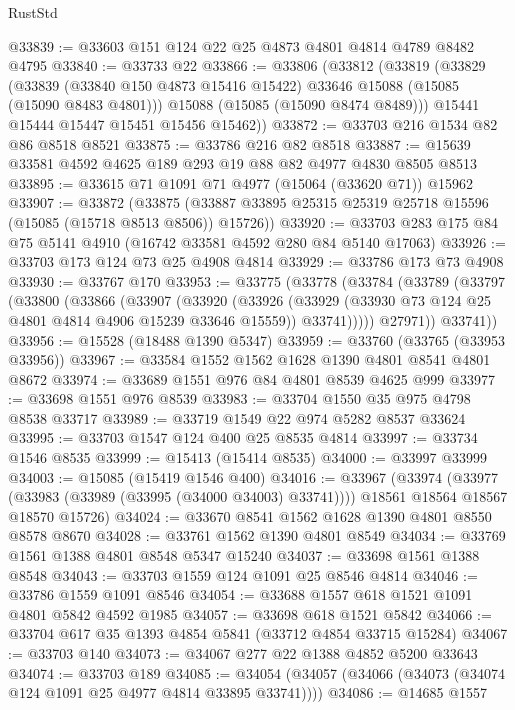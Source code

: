 \begin{lexlean}{RustStd}
\begin{coremodule}
@33839 := @33603 @151 @124 @22 @25 @4873 @4801 @4814 @4789 @8482 @4795
@33840 := @33733 @22
@33866 := @33806
    (@33812
      (@33819
        (@33829
          (@33839 (@33840 @150 @4873 @15416 @15422) @33646 @15088 (@15085 (@15090 @8483 @4801)))
          @15088
          (@15085 (@15090 @8474 @8489)))
        @15441
        @15444
        @15447
        @15451
        @15456
        @15462))
@33872 := @33703 @216 @1534 @82 @86 @8518 @8521
@33875 := @33786 @216 @82 @8518
@33887 := @15639 @33581 @4592 @4625 @189 @293 @19 @88 @82 @4977 @4830 @8505 @8513
@33895 := @33615 @71 @1091 @71 @4977 (@15064 (@33620 @71)) @15962
@33907 := @33872
    (@33875 (@33887 @33895 @25315 @25319 @25718 @15596 (@15085 (@15718 @8513 @8506)) @15726))
@33920 := @33703 @283 @175 @84 @75 @5141 @4910 (@16742 @33581 @4592 @280 @84 @5140 @17063)
@33926 := @33703 @173 @124 @73 @25 @4908 @4814
@33929 := @33786 @173 @73 @4908
@33930 := @33767 @170
@33953 := @33775
    (@33778
      (@33784
        (@33789
          (@33797
            (@33800
              (@33866
                (@33907
                  (@33920
                    (@33926
                      (@33929 (@33930 @73 @124 @25 @4801 @4814 @4906 @15239 @33646 @15559))
                      @33741)))))
            @27971))
        @33741))
@33956 := @15528 (@18488 @1390 @5347)
@33959 := @33760 (@33765 (@33953 @33956))
@33967 := @33584 @1552 @1562 @1628 @1390 @4801 @8541 @4801 @8672
@33974 := @33689 @1551 @976 @84 @4801 @8539 @4625 @999
@33977 := @33698 @1551 @976 @8539
@33983 := @33704 @1550 @35 @975 @4798 @8538 @33717
@33989 := @33719 @1549 @22 @974 @5282 @8537 @33624
@33995 := @33703 @1547 @124 @400 @25 @8535 @4814
@33997 := @33734 @1546 @8535
@33999 := @15413 (@15414 @8535)
@34000 := @33997 @33999
@34003 := @15085 (@15419 @1546 @400)
@34016 := @33967
    (@33974
      (@33977 (@33983 (@33989 (@33995 (@34000 @34003) @33741))))
      @18561
      @18564
      @18567
      @18570
      @15726)
@34024 := @33670 @8541 @1562 @1628 @1390 @4801 @8550 @8578 @8670
@34028 := @33761 @1562 @1390 @4801 @8549
@34034 := @33769 @1561 @1388 @4801 @8548 @5347 @15240
@34037 := @33698 @1561 @1388 @8548
@34043 := @33703 @1559 @124 @1091 @25 @8546 @4814
@34046 := @33786 @1559 @1091 @8546
@34054 := @33688 @1557 @618 @1521 @1091 @4801 @5842 @4592 @1985
@34057 := @33698 @618 @1521 @5842
@34066 := @33704 @617 @35 @1393 @4854 @5841 (@33712 @4854 @33715 @15284)
@34067 := @33703 @140
@34073 := @34067 @277 @22 @1388 @4852 @5200 @33643
@34074 := @33703 @189
@34085 := @34054 (@34057 (@34066 (@34073 (@34074 @124 @1091 @25 @4977 @4814 @33895 @33741))))
@34086 := @14685 @1557

\end{coremodule}
\end{lexlean}
